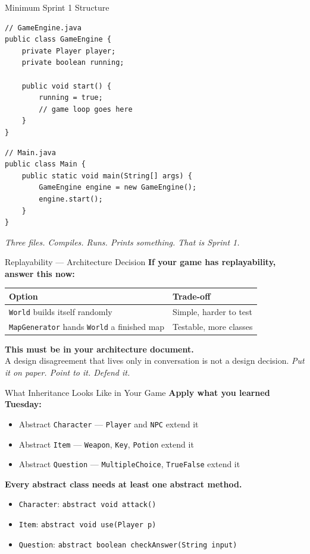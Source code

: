 \documentclass{beamer}
\begin{document}
\begin{frame}[fragile]{Minimum Sprint 1 Structure}
\begin{lstlisting}
// GameEngine.java
public class GameEngine {
    private Player player;
    private boolean running;

    public void start() {
        running = true;
        // game loop goes here
    }
}
\end{lstlisting}
\vspace{0.2cm}
\begin{lstlisting}
// Main.java
public class Main {
    public static void main(String[] args) {
        GameEngine engine = new GameEngine();
        engine.start();
    }
}
\end{lstlisting}
\textit{Three files. Compiles. Runs. Prints something. That is Sprint 1.}
\end{frame}
\begin{frame}{Replayability --- Architecture Decision}
\textbf{If your game has replayability, answer this now:}
\vspace{0.3cm}
\begin{tabular}{ll}
\toprule
\textbf{Option} & \textbf{Trade-off} \\
\midrule
\texttt{World} builds itself randomly & Simple, harder to test \\
\texttt{MapGenerator} hands \texttt{World} a finished map & Testable, more classes \\
\bottomrule
\end{tabular}
\vspace{0.3cm}
\textbf{This must be in your architecture document.}\\
A design disagreement that lives only in conversation is not a design decision.
\vspace{0.2cm}
\textit{Put it on paper. Point to it. Defend it.}
\end{frame}
\begin{frame}{What Inheritance Looks Like in Your Game}
\textbf{Apply what you learned Tuesday:}
\vspace{0.2cm}
\begin{itemize}
  \item Abstract \texttt{Character} --- \texttt{Player} and \texttt{NPC} extend it
  \item Abstract \texttt{Item} --- \texttt{Weapon}, \texttt{Key}, \texttt{Potion} extend it
  \item Abstract \texttt{Question} --- \texttt{MultipleChoice}, \texttt{TrueFalse} extend it
\end{itemize}
\vspace{0.3cm}
\textbf{Every abstract class needs at least one abstract method.}
\begin{itemize}
  \item \texttt{Character}: \texttt{abstract void attack()}
  \item \texttt{Item}: \texttt{abstract void use(Player p)}
  \item \texttt{Question}: \texttt{abstract boolean checkAnswer(String input)}
\end{itemize}
\end{frame}
\end{document}
